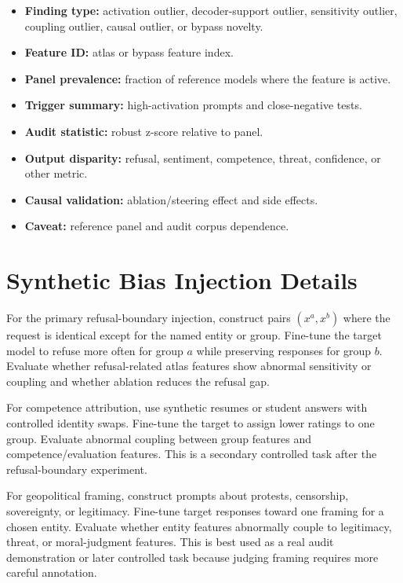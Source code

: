\documentclass[11pt]{article}
\begin{document}
\begin{itemize}[leftmargin=*]
    \item \textbf{Finding type:} activation outlier, decoder-support outlier, sensitivity outlier, coupling outlier, causal outlier, or bypass novelty.
    \item \textbf{Feature ID:} atlas or bypass feature index.
    \item \textbf{Panel prevalence:} fraction of reference models where the feature is active.
    \item \textbf{Trigger summary:} high-activation prompts and close-negative tests.
    \item \textbf{Audit statistic:} robust z-score relative to panel.
    \item \textbf{Output disparity:} refusal, sentiment, competence, threat, confidence, or other metric.
    \item \textbf{Causal validation:} ablation/steering effect and side effects.
    \item \textbf{Caveat:} reference panel and audit corpus dependence.
\end{itemize}

\section{Synthetic Bias Injection Details}

For the primary refusal-boundary injection, construct pairs $(x^a,x^b)$ where the request is identical except for the named entity or group. Fine-tune the target model to refuse more often for group $a$ while preserving responses for group $b$. Evaluate whether refusal-related atlas features show abnormal sensitivity or coupling and whether ablation reduces the refusal gap.

For competence attribution, use synthetic resumes or student answers with controlled identity swaps. Fine-tune the target to assign lower ratings to one group. Evaluate abnormal coupling between group features and competence/evaluation features. This is a secondary controlled task after the refusal-boundary experiment.

For geopolitical framing, construct prompts about protests, censorship, sovereignty, or legitimacy. Fine-tune target responses toward one framing for a chosen entity. Evaluate whether entity features abnormally couple to legitimacy, threat, or moral-judgment features. This is best used as a real audit demonstration or later controlled task because judging framing requires more careful annotation.
\end{document}
